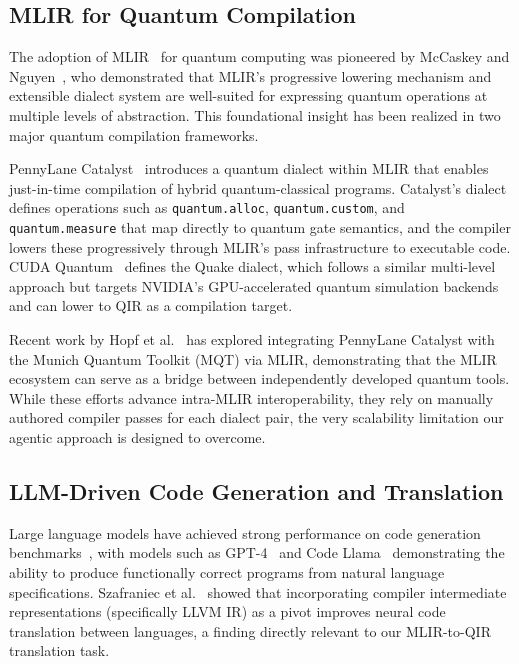 \documentclass[conference]{IEEEtran}
\begin{document}
\subsection{MLIR for Quantum Compilation}

The adoption of MLIR~\cite{lattner2021mlir} for quantum computing was pioneered by McCaskey and Nguyen~\cite{mccaskey2021mlirdialect}, who demonstrated that MLIR's progressive lowering mechanism and extensible dialect system are well-suited for expressing quantum operations at multiple levels of abstraction. This foundational insight has been realized in two major quantum compilation frameworks.

PennyLane Catalyst~\cite{ittah2024catalyst} introduces a quantum dialect within MLIR that enables just-in-time compilation of hybrid quantum-classical programs. Catalyst's dialect defines operations such as \texttt{quantum.alloc}, \texttt{quantum.custom}, and \texttt{quantum.measure} that map directly to quantum gate semantics, and the compiler lowers these progressively through MLIR's pass infrastructure to executable code. CUDA Quantum~\cite{kim2023cudaquantum} defines the Quake dialect, which follows a similar multi-level approach but targets NVIDIA's GPU-accelerated quantum simulation backends and can lower to QIR as a compilation target.

Recent work by Hopf et al.~\cite{hopf2026integrating} has explored integrating PennyLane Catalyst with the Munich Quantum Toolkit (MQT) via MLIR, demonstrating that the MLIR ecosystem can serve as a bridge between independently developed quantum tools. While these efforts advance intra-MLIR interoperability, they rely on manually authored compiler passes for each dialect pair, the very scalability limitation our agentic approach is designed to overcome.

\subsection{LLM-Driven Code Generation and Translation}

Large language models have achieved strong performance on code generation benchmarks~\cite{chen2021codex, li2022alphacode, austin2021program}, with models such as GPT-4~\cite{achiam2023gpt4} and Code Llama~\cite{roziere2023codellama} demonstrating the ability to produce functionally correct programs from natural language specifications. Szafraniec et al.~\cite{szafraniec2023code} showed that incorporating compiler intermediate representations (specifically LLVM IR) as a pivot improves neural code translation between languages, a finding directly relevant to our MLIR-to-QIR translation task.
\end{document}
